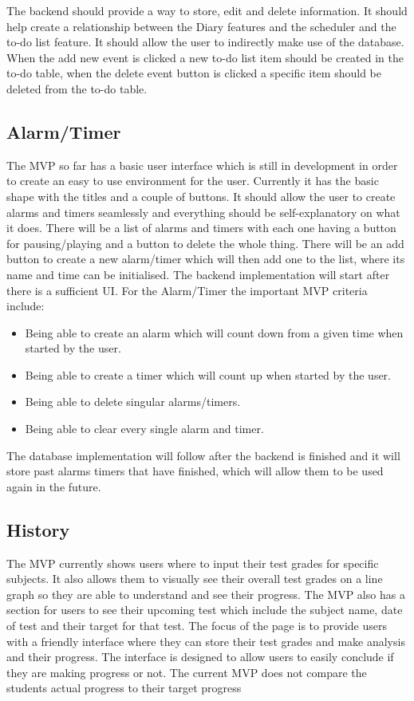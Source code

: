 \documentclass[a4paper]{article}
\begin{document}
{The backend should provide a way to store, edit and delete information. It should help create a relationship between the Diary features and the scheduler and the to-do list feature. It should allow the user to indirectly make use of the database. When the add new event is clicked a new to-do list item should be created in the to-do table, when the delete event button is clicked a specific item should be deleted from the to-do table.

\subsection{Alarm/Timer}

The MVP so far has a basic user interface which is still in development in order to create an easy to use environment for the user. Currently it has the basic shape with the titles and a couple of buttons. It should allow the user to create alarms and timers seamlessly and everything should be self-explanatory on what it does. There will be a list of alarms and timers with each one having a button for pausing/playing and a button to delete the whole thing. There will be an add button to create a new alarm/timer which will then add one to the list, where its name and time can be initialised.
The backend implementation will start after there is a sufficient UI. For the Alarm/Timer the important MVP criteria include:
\begin{itemize}[itemsep=0.5\itemsep, parsep=0\parsep]
	\item Being able to create an alarm which will count down from a given time when started by the user.
	\item Being able to create a timer which will count up when started by the user.
	\item Being able to delete singular alarms/timers.
	\item Being able to clear every single alarm and timer.
\end{itemize}
The database implementation will follow after the backend is finished and it will store past alarms timers that have finished, which will allow them to be used again in the future. 

\subsection{History}
 
The MVP currently shows users where to input their test grades for specific subjects. It also allows them to visually see their overall test grades on a line graph so they are able to understand and see their progress. The MVP also has a section for users to see their upcoming test which include the subject name, date of test and their target for that test. The focus of the page is to provide users with a friendly interface where they can store their test grades and make analysis and their progress. The interface is designed to allow users to easily conclude if they are making progress or not. The current MVP does not compare the students actual progress to their target progress 

}
\end{document}
